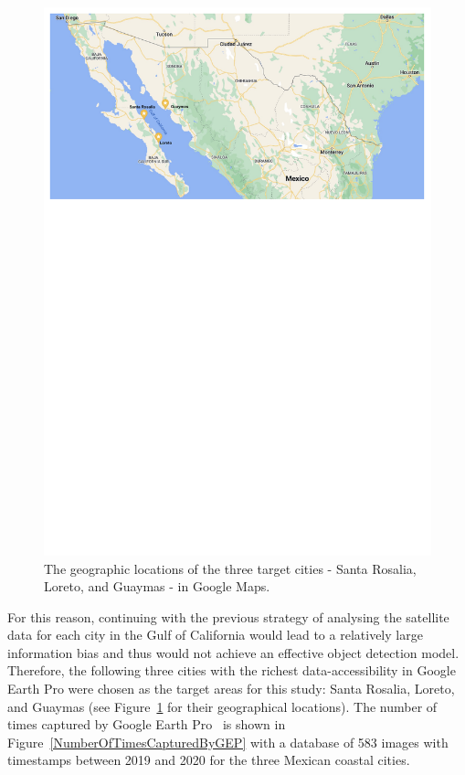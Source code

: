 \begin{figure}[!t]
    \center
    \includegraphics[width=\columnwidth]{img/locations_maps.pdf}
    \caption{The geographic locations of the three target cities - Santa Rosalia, Loreto, and Guaymas - in Google Maps.}
    \label{locations_maps}
\end{figure}


For this reason, continuing with the previous strategy of analysing the satellite data for each city in the Gulf of California would lead to a relatively large information bias and thus would not achieve an effective object detection model. Therefore, the following three cities with the richest data-accessibility in Google Earth Pro were chosen as the target areas for this study: Santa Rosalia, Loreto, and Guaymas (see Figure~\ref{locations_maps} for their geographical locations). The number of times captured by Google Earth Pro~\cite{lisle2006google} is shown in Figure~\ref{NumberOfTimesCapturedByGEP} with a database of 583 images with timestamps between 2019 and 2020 for the three Mexican coastal cities.


